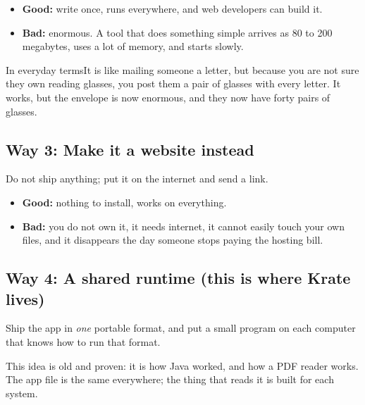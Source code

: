 \documentclass[11pt,a4paper]{report}
\newcommand{\analogy}[1]{\begin{plainbox}{In everyday terms}#1\end{plainbox}}
\begin{document}
\begin{itemize}[leftmargin=*]
  \item \textbf{Good:} write once, runs everywhere, and web developers can
    build it.
  \item \textbf{Bad:} enormous. A tool that does something simple arrives
    as 80 to 200 megabytes, uses a lot of memory, and starts slowly.
\end{itemize}

\analogy{It is like mailing someone a letter, but because you are not sure
they own reading glasses, you post them a pair of glasses with every
letter. It works, but the envelope is now enormous, and they now have
forty pairs of glasses.}

\subsection{Way 3: Make it a website instead}

Do not ship anything; put it on the internet and send a link.

\begin{itemize}[leftmargin=*]
  \item \textbf{Good:} nothing to install, works on everything.
  \item \textbf{Bad:} you do not own it, it needs internet, it cannot
    easily touch your own files, and it disappears the day someone stops
    paying the hosting bill.
\end{itemize}

\subsection{Way 4: A shared runtime (this is where Krate lives)}

Ship the app in \emph{one} portable format, and put a small program on
each computer that knows how to run that format.

This idea is old and proven: it is how Java worked, and how a PDF reader
works. The app file is the same everywhere; the thing that reads it is
built for each system.

\begin{center}
\end{center}
\end{document}
